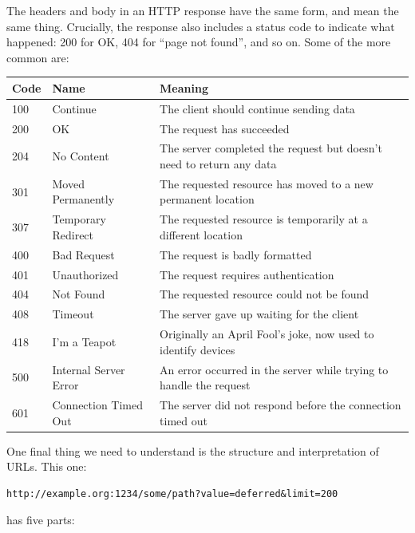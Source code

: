 The headers and body in an HTTP response have the same form, and mean
the same thing. Crucially, the response also includes a status code to
indicate what happened: 200 for OK, 404 for ``page not found'', and so
on. Some of the more common are:

\begin{longtable}[]{@{}lll@{}}
\toprule
Code & Name & Meaning\tabularnewline
\midrule
\endhead
100 & Continue & The client should continue sending data\tabularnewline
200 & OK & The request has succeeded\tabularnewline
204 & No Content & The server completed the request but doesn't need to
return any data\tabularnewline
301 & Moved Permanently & The requested resource has moved to a new
permanent location\tabularnewline
307 & Temporary Redirect & The requested resource is temporarily at a
different location\tabularnewline
400 & Bad Request & The request is badly formatted\tabularnewline
401 & Unauthorized & The request requires authentication\tabularnewline
404 & Not Found & The requested resource could not be
found\tabularnewline
408 & Timeout & The server gave up waiting for the client\tabularnewline
418 & I'm a Teapot & Originally an April Fool's joke, now used to
identify devices\tabularnewline
500 & Internal Server Error & An error occurred in the server while
trying to handle the request\tabularnewline
601 & Connection Timed Out & The server did not respond before the
connection timed out\tabularnewline
\bottomrule
\end{longtable}

One final thing we need to understand is the structure and
interpretation of URLs. This one:

\begin{verbatim}
http://example.org:1234/some/path?value=deferred&limit=200
\end{verbatim}

has five parts:

